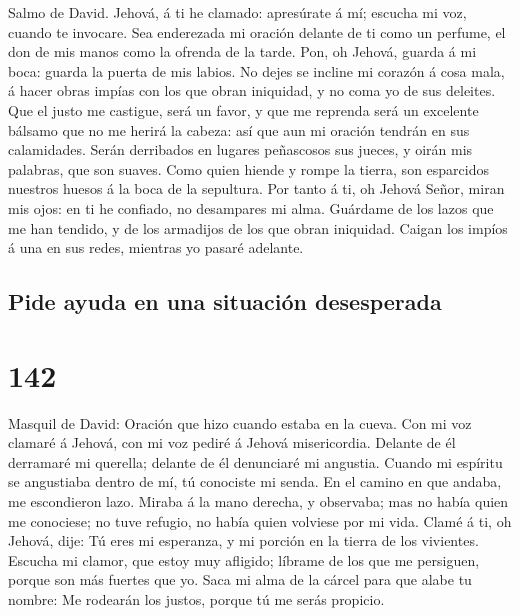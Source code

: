 Salmo de David. Jehová, á ti he clamado: apresúrate á mí;
escucha mi voz, cuando te invocare.  Sea enderezada mi
oración delante de ti como un perfume, el don de mis manos como la
ofrenda de la tarde.  Pon, oh Jehová, guarda á mi boca:
guarda la puerta de mis labios.  No dejes se incline mi
corazón á cosa mala, á hacer obras impías con los que obran iniquidad, y
no coma yo de sus deleites.  Que el justo me castigue,
será un favor, y que me reprenda será un excelente bálsamo que no me
herirá la cabeza: así que aun mi oración tendrán en sus calamidades.
 Serán derribados en lugares peñascosos sus jueces, y
oirán mis palabras, que son suaves.  Como quien hiende y
rompe la tierra, son esparcidos nuestros huesos á la boca de la
sepultura.  Por tanto á ti, oh Jehová Señor, miran mis
ojos: en ti he confiado, no desampares mi alma.  Guárdame
de los lazos que me han tendido, y de los armadijos de los que obran
iniquidad.  Caigan los impíos á una en sus redes,
mientras yo pasaré adelante.

\hypertarget{pide-ayuda-en-una-situaciuxf3n-desesperada}{%
\subsection{Pide ayuda en una situación
desesperada}\label{pide-ayuda-en-una-situaciuxf3n-desesperada}}

\hypertarget{section-141}{%
\section{142}\label{section-141}}

 Masquil de David: Oración que hizo cuando estaba en la
cueva. Con mi voz clamaré á Jehová, con mi voz pediré á Jehová
misericordia.  Delante de él derramaré mi querella;
delante de él denunciaré mi angustia.  Cuando mi espíritu
se angustiaba dentro de mí, tú conociste mi senda. En el camino en que
andaba, me escondieron lazo.  Miraba á la mano derecha, y
observaba; mas no había quien me conociese; no tuve refugio, no había
quien volviese por mi vida.  Clamé á ti, oh Jehová, dije:
Tú eres mi esperanza, y mi porción en la tierra de los vivientes.
 Escucha mi clamor, que estoy muy afligido; líbrame de los
que me persiguen, porque son más fuertes que yo.  Saca mi
alma de la cárcel para que alabe tu nombre: Me rodearán los justos,
porque tú me serás propicio.

